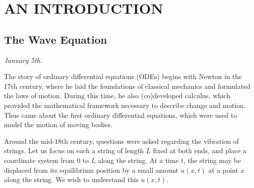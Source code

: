 \chapter{AN INTRODUCTION}


\section{The Wave Equation}
\textit{January 5th.}

The story of ordinary differential equations (ODEs) begins with Newton in the 17th century, where he laid the foundations of classical mechanics and formulated the laws of motion. During this time, he also (co)developed calculus, which provided the mathematical framework necessary to describe change and motion. Thus came about the first ordinary differential equations, which were used to model the motion of moving bodies.

Around the mid-18th century, questions were asked regarding the vibration of strings. Let us focus on such a string of length $L$ fixed at both ends, and place a coordinate system from $0$ to $L$ along the string. At a time $t$, the string may be displaced from its equilibrium position by a small amount $u(x,t)$ at a point $x$ along the string. We wish to understand this $u(x,t)$.

